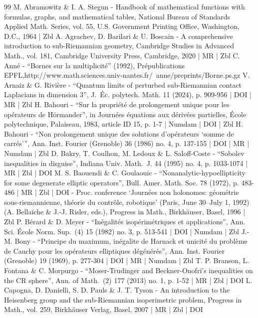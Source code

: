 \begin{thebibliography}{99}
M. Abramowitz \& I. A. Stegun - Handbook of mathematical functions with formulas, graphs, and mathematical tables, National Bureau of Standards Applied Math. Series, vol. 55, U.S. Government Printing Office, Washington, D.C., 1964 | Zbl
A. Agrachev, D. Barilari \& U. Boscain - A comprehensive introduction to sub-Riemannian geometry, Cambridge Studies in Advanced Math., vol. 181, Cambridge University Press, Cambridge, 2020 | MR | Zbl
C. Anné - “Bornes sur la multiplicité” (1992), Prépublications EPFL,http://www.math.sciences.univ-nantes.fr/~anne/preprints/Borne.ps.gz
V. Arnaiz \& G. Rivière - “Quantum limits of perturbed sub-Riemannian contact Laplacians in dimension 3”, J. Éc. polytech. Math. 11 (2024), p. 909-956 | DOI | MR | Zbl
H. Bahouri - “Sur la propriété de prolongement unique pour les opérateurs de Hörmander”, in Journées équations aux dérivées partielles, École polytechnique, Palaiseau, 1983, article ID 15, p. 1-7 | Numdam | DOI | Zbl
H. Bahouri - “Non prolongement unique des solutions d’opérateurs ‘somme de carrés’”, Ann. Inst. Fourier (Grenoble) 36 (1986) no. 4, p. 137-155 | DOI | MR | Numdam | Zbl
D. Bakry, T. Coulhon, M. Ledoux \& L. Saloff-Coste - “Sobolev inequalities in disguise”, Indiana Univ. Math. J. 44 (1995) no. 4, p. 1033-1074 | MR | Zbl | DOI
M. S. Baouendi \& C. Goulaouic - “Nonanalytic-hypoellipticity for some degenerate elliptic operators”, Bull. Amer. Math. Soc. 78 (1972), p. 483-486 | MR | Zbl | DOI
- Proc. conference ‘Journées non holonomes: géométrie sous-riemannienne, théorie du contrôle, robotique’ (Paris, June 30–July 1, 1992) (A. Bellaïche \& J.-J. Risler, eds.), Progress in Math., Birkhäuser, Basel, 1996 | Zbl
P. Bérard \& D. Meyer - “Inégalités isopérimétriques et applications”, Ann. Sci. École Norm. Sup. (4) 15 (1982) no. 3, p. 513-541 | DOI | Numdam | Zbl
J.-M. Bony - “Principe du maximum, inégalite de Harnack et unicité du problème de Cauchy pour les opérateurs elliptiques dégénérés”, Ann. Inst. Fourier (Grenoble) 19 (1969), p. 277-304 | DOI | MR | Numdam | Zbl
T. P. Branson, L. Fontana \& C. Morpurgo - “Moser-Trudinger and Beckner-Onofri’s inequalities on the CR sphere”, Ann. of Math. (2) 177 (2013) no. 1, p. 1-52 | MR | Zbl | DOI
L. Capogna, D. Danielli, S. D. Pauls \& J. T. Tyson - An introduction to the Heisenberg group and the sub-Riemannian isoperimetric problem, Progress in Math., vol. 259, Birkhäuser Verlag, Basel, 2007 | MR | Zbl | DOI

\end{thebibliography}

